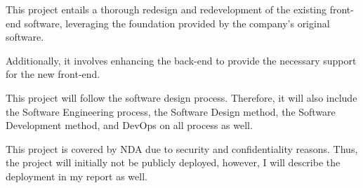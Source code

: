 This project entails a thorough redesign and redevelopment of the existing front-end software, 
leveraging the foundation provided by the company's original software. 

Additionally, it involves enhancing the back-end to provide the necessary support 
for the new front-end.

This project will follow the software design process. Therefore, it will also include
the Software Engineering process, the Software Design method,
the Software Development method, and DevOps on all process as well. 

This project is covered by NDA due to security and confidentiality reasons. Thus, the
project will initially not be publicly deployed, however, I will describe the
deployment in my report as well.
